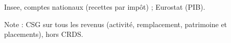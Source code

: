 Insee, comptes nationaux (recettes par impôt) ; Eurostat (PIB).\par Note : CSG sur tous les revenus (activité, remplacement, patrimoine et placements), hors CRDS.
